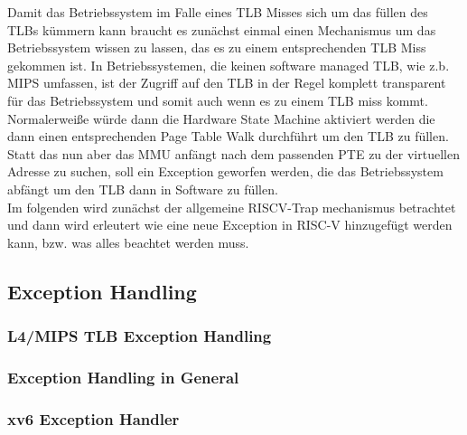 Damit das Betriebssystem im Falle eines TLB Misses sich um das füllen des TLBs kümmern kann
braucht es zunächst einmal einen Mechanismus um das Betriebssystem wissen zu lassen,
das es zu einem entsprechenden TLB Miss gekommen ist. In Betriebssystemen, die keinen
software managed TLB, wie z.b. MIPS \cite{MIPSArchitectureProgrammers2016} umfassen, ist der
Zugriff auf den TLB in der Regel komplett transparent für das Betriebssystem und somit auch wenn
es zu einem TLB miss kommt. Normalerweiße würde dann die Hardware State Machine aktiviert werden
die dann einen entsprechenden Page Table Walk durchführt um den TLB zu füllen.
Statt das nun aber das MMU anfängt nach dem passenden PTE zu der virtuellen Adresse zu suchen,
soll ein Exception geworfen werden, die das Betriebssystem abfängt um den TLB dann in Software
zu füllen.\\
Im folgenden wird zunächst der allgemeine RISCV-Trap mechanismus betrachtet und dann
wird erleutert wie eine neue Exception in RISC-V hinzugefügt werden kann, bzw. was alles beachtet
werden muss.


\subsection{Exception Handling}

\subsubsection{L4/MIPS TLB Exception Handling}

\subsubsection{Exception Handling in General}

\subsubsection{xv6 Exception Handler}

